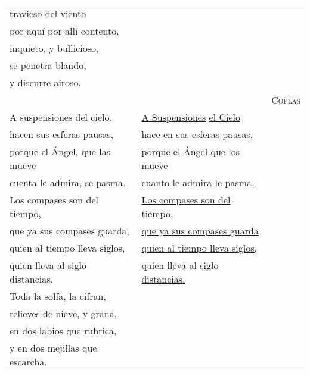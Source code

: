 \documentclass{aac-table}
\newcommand{\str}{\hspace{1em}}
\begin{document}
\begin{longtable}{lll}
    travieso del viento &
    & \\

    por aquí por allí contento, &
    & \\

    inquieto, y bullicioso, &
    & \\

    se penetra blando, &
    & \\

    y discurre airoso.
    & \\

    \addlinespace
    \newpage
    &
    &
    \textsc{Coplas} \\


    \str{} A suspensiones del cielo. &
    \str{} \uline{A Suspensiones} \uline{el Cielo} & 
    \\

    hacen sus esferas pausas, &
    \uline{hace} \uline{en sus esferas pausas,} &
    \\

    porque el Ángel, que las mueve &
    \uline{porque el Ángel que} los \uline{mueve} &
    \\

    cuenta le admira, se pasma. &
    \uline{cuanto le admira} le \uline{pasma.} &
    \\

    \str{} Los compases son del tiempo, &
    \str{} \uline{Los compases son del tiempo,} &
    \\

    que ya sus compases guarda, &
    \uline{que ya sus compases guarda} &
    \\

    quien al tiempo lleva siglos, &
    \uline{quien al tiempo lleva siglos,} &
    \\

    quien lleva al siglo distancias. &
    \uline{quien lleva al siglo distancias.} &
    \\

    \str{} Toda la solfa, la cifran, &
    & \\

    relieves de nieve, y grana, &
    & \\

    en dos labios que rubrica, &
    & \\

    y en dos mejillas que escarcha. &
    & \\


\end{longtable}
\end{document}
